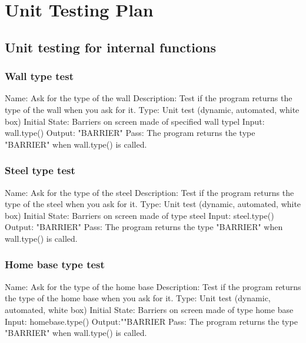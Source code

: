 \documentclass{article}
\begin{document}
\section{Unit Testing Plan}
\subsection{Unit testing for internal functions}
\subsubsection{Wall type test}
Name:  Ask for the type of the wall\newline
Description: Test if the program returns the type of the wall when you ask for 
it. \newline
Type: Unit test (dynamic, automated, white box) \newline
Initial State:  Barriers on screen made of specified wall typel \newline
Input: wall.type()\newline
Output: "BARRIER"  \newline
Pass:   The program returns the type "BARRIER" when wall.type() is called. 
\newline

\subsubsection{Steel type test}
Name:  Ask for the type of the steel\newline
Description: Test if the program returns the type of the steel when you ask for 
it. \newline
Type: Unit test (dynamic, automated, white box) \newline
Initial State:  Barriers on screen made of type steel \newline
Input: steel.type()\newline
Output: "BARRIER"  \newline
Pass:  The program returns the type "BARRIER" when wall.type() is called. 
\newline

\subsubsection{Home base type test}
Name:  Ask for the type of the home base\newline
Description: Test if the program returns the type of the home base when you ask
 for it. \newline
Type: Unit test (dynamic, automated, white box) \newline
Initial State:  Barriers on screen made of type home base \newline
Input: homebase.type()\newline
Output:""BARRIER \newline
Pass:  The program returns the type "BARRIER" when wall.type() is called. 
\newline
\end{document}
